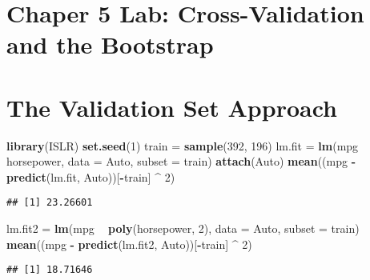 \documentclass[
]{article}
\author{}
\date{\vspace{-2.5em}}
\newenvironment{Shaded}{\begin{snugshade}}{\end{snugshade}}
\newcommand{\DataTypeTok}[1]{\textcolor[rgb]{0.13,0.29,0.53}{#1}}
\newcommand{\DecValTok}[1]{\textcolor[rgb]{0.00,0.00,0.81}{#1}}
\newcommand{\KeywordTok}[1]{\textcolor[rgb]{0.13,0.29,0.53}{\textbf{#1}}}
\newcommand{\NormalTok}[1]{#1}
\newcommand{\OperatorTok}[1]{\textcolor[rgb]{0.81,0.36,0.00}{\textbf{#1}}}
\newcommand{\StringTok}[1]{\textcolor[rgb]{0.31,0.60,0.02}{#1}}
\begin{document}
\hypertarget{chaper-5-lab-cross-validation-and-the-bootstrap}{%
\section{Chaper 5 Lab: Cross-Validation and the
Bootstrap}\label{chaper-5-lab-cross-validation-and-the-bootstrap}}

\hypertarget{the-validation-set-approach}{%
\section{The Validation Set
Approach}\label{the-validation-set-approach}}

\begin{Shaded}
\begin{Highlighting}[]
\KeywordTok{library}\NormalTok{(ISLR)}
\KeywordTok{set.seed}\NormalTok{(}\DecValTok{1}\NormalTok{)}
\NormalTok{train =}\StringTok{ }\KeywordTok{sample}\NormalTok{(}\DecValTok{392}\NormalTok{, }\DecValTok{196}\NormalTok{)}
\NormalTok{lm.fit =}\StringTok{ }\KeywordTok{lm}\NormalTok{(mpg }\OperatorTok{~}\StringTok{ }\NormalTok{horsepower, }\DataTypeTok{data =}\NormalTok{ Auto, }\DataTypeTok{subset =}\NormalTok{ train)}
\KeywordTok{attach}\NormalTok{(Auto)}
\KeywordTok{mean}\NormalTok{((mpg }\OperatorTok{-}\StringTok{ }\KeywordTok{predict}\NormalTok{(lm.fit, Auto))[}\OperatorTok{-}\NormalTok{train] }\OperatorTok{^}\StringTok{ }\DecValTok{2}\NormalTok{)}
\end{Highlighting}
\end{Shaded}

\begin{verbatim}
## [1] 23.26601
\end{verbatim}

\begin{Shaded}
\begin{Highlighting}[]
\NormalTok{lm.fit2 =}\StringTok{ }\KeywordTok{lm}\NormalTok{(mpg }\OperatorTok{~}\StringTok{ }\KeywordTok{poly}\NormalTok{(horsepower, }\DecValTok{2}\NormalTok{), }\DataTypeTok{data =}\NormalTok{ Auto, }\DataTypeTok{subset =}\NormalTok{ train)}
\KeywordTok{mean}\NormalTok{((mpg }\OperatorTok{-}\StringTok{ }\KeywordTok{predict}\NormalTok{(lm.fit2, Auto))[}\OperatorTok{-}\NormalTok{train] }\OperatorTok{^}\StringTok{ }\DecValTok{2}\NormalTok{)}
\end{Highlighting}
\end{Shaded}

\begin{verbatim}
## [1] 18.71646
\end{verbatim}
\end{document}
